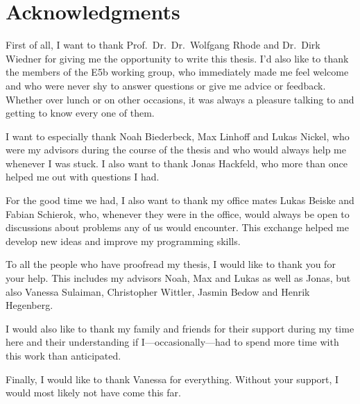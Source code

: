 \chapter{Acknowledgments}

First of all, I want to thank Prof.~Dr.~Dr.~Wolfgang Rhode and Dr.~Dirk Wiedner for giving me the opportunity to
write this thesis. I'd also like to thank the members of the E5b working group, who immediately
made me feel welcome and who were never shy to answer questions or give me advice or feedback.
Whether over lunch or on other occasions, it was always a pleasure talking to and getting to know
every one of them.

I want to especially thank Noah Biederbeck, Max Linhoff and Lukas Nickel, who were my advisors
during the course of the thesis and who would always help me whenever I was stuck. I also want to
thank Jonas Hackfeld, who more than once helped me out with questions I had.

For the good time we had, I also want to thank my office mates Lukas Beiske and Fabian Schierok,
who, whenever they were in the office, would always be open to discussions about problems any of
us would encounter. This exchange helped me develop new ideas and improve my programming skills.

To all the people who have proofread my thesis, I would like to thank you for your help. This includes
my advisors Noah, Max and Lukas as well as Jonas, but also Vanessa Sulaiman, Christopher Wittler,
Jasmin Bedow and Henrik Hegenberg.

I would also like to thank my family and friends for their support during my time here and their
understanding if I---occasionally---had to spend more time with this work than anticipated.

Finally, I would like to thank Vanessa for everything. Without your support, I would most likely not have
come this far.